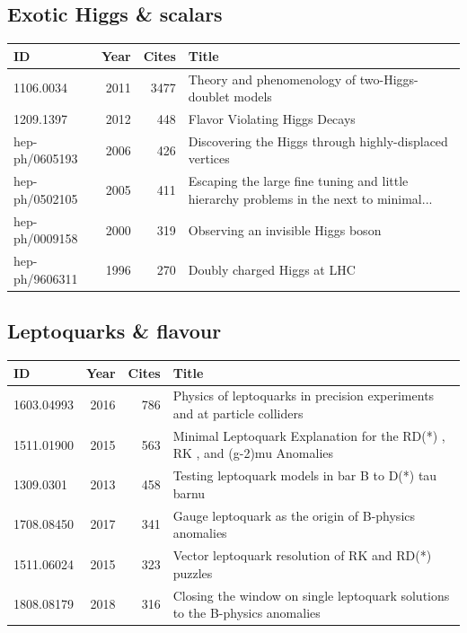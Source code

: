 \documentclass[11pt,a4paper]{article}
\begin{document}
\subsection*{Exotic Higgs \& scalars}
\begin{center}\footnotesize\begin{tabular}{@{}p{2.5cm}rr p{9cm}@{}}\toprule ID & Year & Cites & Title\\\midrule
1106.0034 & 2011 & 3477 & Theory and phenomenology of two-Higgs-doublet models\\
1209.1397 & 2012 & 448 & Flavor Violating Higgs Decays\\
hep-ph/0605193 & 2006 & 426 & Discovering the Higgs through highly-displaced vertices\\
hep-ph/0502105 & 2005 & 411 & Escaping the large fine tuning and little hierarchy problems in the next to minimal...\\
hep-ph/0009158 & 2000 & 319 & Observing an invisible Higgs boson\\
hep-ph/9606311 & 1996 & 270 & Doubly charged Higgs at LHC\\
\bottomrule\end{tabular}\end{center}
\subsection*{Leptoquarks \& flavour}
\begin{center}\footnotesize\begin{tabular}{@{}p{2.5cm}rr p{9cm}@{}}\toprule ID & Year & Cites & Title\\\midrule
1603.04993 & 2016 & 786 & Physics of leptoquarks in precision experiments and at particle colliders\\
1511.01900 & 2015 & 563 & Minimal Leptoquark Explanation for the RD(*) , RK , and (g-2)mu Anomalies\\
1309.0301 & 2013 & 458 & Testing leptoquark models in bar B to D(*) tau barnu\\
1708.08450 & 2017 & 341 & Gauge leptoquark as the origin of B-physics anomalies\\
1511.06024 & 2015 & 323 & Vector leptoquark resolution of RK and RD(*) puzzles\\
1808.08179 & 2018 & 316 & Closing the window on single leptoquark solutions to the B-physics anomalies\\
\bottomrule\end{tabular}\end{center}
\end{document}
